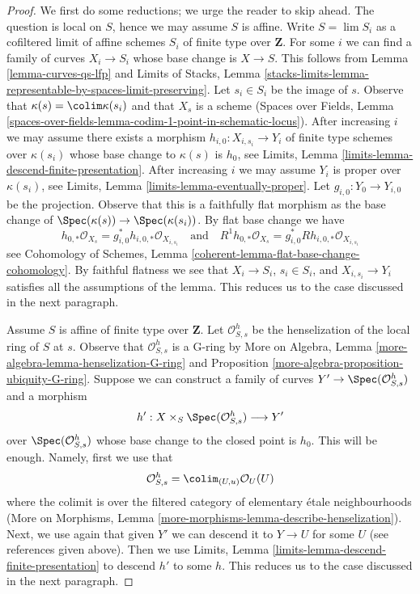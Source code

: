 \begin{proof}
We first do some reductions; we urge the reader to skip ahead.
The question is local on $S$, hence we may assume $S$ is affine.
Write $S = \lim S_i$ as a cofiltered limit of affine schemes $S_i$
of finite type over $\mathbf{Z}$.
For some $i$ we can find a family of curves $X_i \to S_i$
whose base change is $X \to S$. This follows from
Lemma \ref{lemma-curves-qs-lfp} and
Limits of Stacks, Lemma
\ref{stacks-limits-lemma-representable-by-spaces-limit-preserving}.
Let $s_i \in S_i$ be the image of $s$. Observe that
$\kappa(s) = \colim \kappa(s_i)$ and that $X_s$ is a scheme
(Spaces over Fields, Lemma
\ref{spaces-over-fields-lemma-codim-1-point-in-schematic-locus}).
After increasing $i$ we may assume there exists a morphism
$h_{i, 0} : X_{i, s_i} \to Y_i$
of finite type schemes over $\kappa(s_i)$ whose base change to
$\kappa(s)$ is $h_0$, see
Limits, Lemma \ref{limits-lemma-descend-finite-presentation}.
After increasing $i$ we may assume $Y_i$ is proper over $\kappa(s_i)$, see
Limits, Lemma \ref{limits-lemma-eventually-proper}.
Let $g_{i, 0} : Y_0 \to Y_{i, 0}$ be the projection. Observe that
this is a faithfully flat morphism as the base change of
$\Spec(\kappa(s)) \to \Spec(\kappa(s_i))$.
By flat base change we have
$$
h_{0, *}\mathcal{O}_{X_s} = g_{i, 0}^*h_{i, 0, *}\mathcal{O}_{X_{i, s_i}}
\quad\text{and}\quad
R^1h_{0, *}\mathcal{O}_{X_s} = g_{i, 0}^*Rh_{i, 0, *}\mathcal{O}_{X_{i, s_i}}
$$
see Cohomology of Schemes, Lemma
\ref{coherent-lemma-flat-base-change-cohomology}.
By faithful flatness we see that $X_i \to S_i$, $s_i \in S_i$, and
$X_{i, s_i} \to Y_i$ satisfies all the assumptions of the lemma.
This reduces us to the case discussed in the next paragraph.

\medskip\noindent
Assume $S$ is affine of finite type over $\mathbf{Z}$.
Let $\mathcal{O}_{S, s}^h$ be the henselization of the local
ring of $S$ at $s$. Observe that $\mathcal{O}_{S, s}^h$ is a G-ring by
More on Algebra, Lemma \ref{more-algebra-lemma-henselization-G-ring} and
Proposition \ref{more-algebra-proposition-ubiquity-G-ring}.
Suppose we can construct a family of curves
$Y' \to \Spec(\mathcal{O}_{S, s}^h)$ and a morphism
$$
h' : X \times_S \Spec(\mathcal{O}_{S, s}^h) \longrightarrow Y'
$$
over $\Spec(\mathcal{O}_{S, s}^h)$ whose base change to the closed
point is $h_0$. This will be enough. Namely, first we use that
$$
\mathcal{O}_{S, s}^h = \colim_{(U, u)} \mathcal{O}_U(U)
$$
where the colimit is over the filtered category of 
elementary \'etale neighbourhoods (More on Morphisms, Lemma
\ref{more-morphisms-lemma-describe-henselization}).
Next, we use again that given $Y'$ we can descend it to
$Y \to U$ for some $U$ (see references given above).
Then we use
Limits, Lemma \ref{limits-lemma-descend-finite-presentation}
to descend $h'$ to some $h$. This reduces us to the case
discussed in the next paragraph.


\end{proof}
